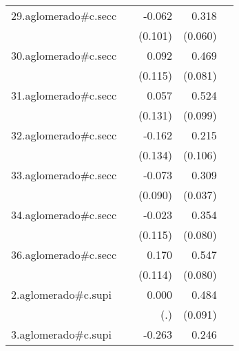 {\begin{longtable}{l*{4}{D{.}{.}{-1}}}
\addlinespace
29.aglomerado#c.secc&                     &      -0.062         &       0.318\sym{***}&                     \\
            &                     &     (0.101)         &     (0.060)         &                     \\
\addlinespace
30.aglomerado#c.secc&                     &       0.092         &       0.469\sym{***}&                     \\
            &                     &     (0.115)         &     (0.081)         &                     \\
\addlinespace
31.aglomerado#c.secc&                     &       0.057         &       0.524\sym{***}&                     \\
            &                     &     (0.131)         &     (0.099)         &                     \\
\addlinespace
32.aglomerado#c.secc&                     &      -0.162         &       0.215\sym{*}  &                     \\
            &                     &     (0.134)         &     (0.106)         &                     \\
\addlinespace
33.aglomerado#c.secc&                     &      -0.073         &       0.309\sym{***}&                     \\
            &                     &     (0.090)         &     (0.037)         &                     \\
\addlinespace
34.aglomerado#c.secc&                     &      -0.023         &       0.354\sym{***}&                     \\
            &                     &     (0.115)         &     (0.080)         &                     \\
\addlinespace
36.aglomerado#c.secc&                     &       0.170         &       0.547\sym{***}&                     \\
            &                     &     (0.114)         &     (0.080)         &                     \\
\addlinespace
2.aglomerado#c.supi&                     &       0.000         &       0.484\sym{***}&                     \\
            &                     &         (.)         &     (0.091)         &                     \\
\addlinespace
3.aglomerado#c.supi&                     &      -0.263\sym{*}  &       0.246\sym{**} &                     \\

\end{longtable}}
